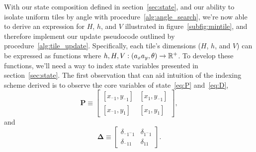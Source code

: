 With our state composition defined in section~\ref{sec:state}, and our ability to isolate uniform tiles by
angle with
procedure~\ref{alg:angle_search}, we're now able to derive an expression for $H$, $h$, and $V$ illustrated in
figure~\ref{subfig:mintile}, and therefore  implement our update pseudocode outlined by
procedure~\ref{alg:tile_update}.  Specifically, each tile's dimensions ($H$, $h$, and $V$) can be
expressed as functions where $h,H,V: (a_xa_y,\theta) \rightarrow \mathbb{R}^+$.
To develop these functions, we'll need a way to index state variables presented in section~\ref{sec:state}.
  The first observation that can aid intuition of the indexing scheme derived is to observe the core
  variables of state~\ref{eq:P} and~\ref{eq:D},
\[
  \mathbf{P} \equiv \begin{bmatrix}
    [x_{^-1}, y_{^-1}] & [x_1, y_{^-1}] \\
    [x_{^-1}, y_1] & [x_1, y_1]
  \end{bmatrix},
\]
and
\[
  \mathbf{\Delta} \equiv \begin{bmatrix}
    \delta_{^-1^-1} & \delta_{1^-1} \\
    \delta_{^-11} & \delta_{11}
    \end{bmatrix}.
\]


